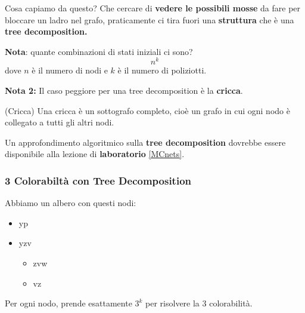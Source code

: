 Cosa capiamo da questo? Che cercare di \textbf{vedere le possibili mosse} da
fare per bloccare un ladro nel grafo, praticamente ci tira fuori una
\textbf{struttura} che è una \textbf{tree decomposition.}

\textbf{Nota}: quante combinazioni di stati iniziali ci sono?
\[
    n^k
\]
dove $n$ è il numero di nodi e $k$ è il numero di poliziotti.

\textbf{Nota 2:} Il caso peggiore per una tree decomposition è la \textbf{cricca}.

\begin{definition}(Cricca)
    Una cricca è un sottografo completo, cioè un grafo in cui ogni nodo è collegato a tutti gli altri nodi.
\end{definition}

Un approfondimento algoritmico sulla \textbf{tree decomposition} dovrebbe
essere disponibile alla lezione di \textbf{laboratorio} \ref{MCnets}.

\subsubsection{3 Colorabiltà con Tree Decomposition}

Abbiamo un albero con questi nodi:
\begin{itemize}
    \item yp
    \item yzv
          \begin{itemize}
              \item zvw
              \item vz
          \end{itemize}
\end{itemize}


Per ogni nodo, prende esattamente $3^k$ per risolvere la 3 colorabilità.

